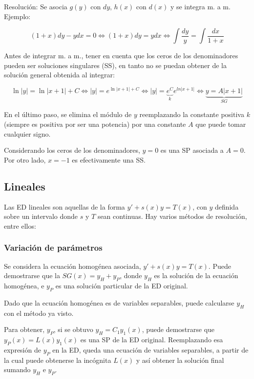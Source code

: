 \documentclass{article}
\begin{document}
Resolución: Se asocia $g(y)$ con $dy$, $h(x)$ con $d(x)$ y se integra m. a m. Ejemplo:

\begin{equation}
(1+x) dy - y dx = 0 \Leftrightarrow (1+x) dy = y dx \Leftrightarrow \int \frac{dy}{y} = \int \frac{dx}{1+x}
\end{equation}

Antes de integrar m. a m., tener en cuenta que los ceros de los denominadores pueden ser soluciones singulares (SS), en tanto no se puedan obtener de la solución general obtenida al integrar:

\begin{equation}
\ln |y| = \ln |x + 1| + C \Leftrightarrow |y| = e^{\ln |x+1| + C } \Leftrightarrow |y| = \underbrace{e^C}_{k} e^{ln |x+1|} \Leftrightarrow \underbrace{y = A |x+1|}_{SG}
\end{equation}

En el último paso, se elimina el módulo de $y$ reemplazando la constante positiva $k$ (siempre es positiva por ser una potencia) por una constante $A$ que puede tomar cualquier signo.

Considerando los ceros de los denominadores, $y = 0$ es una SP asociada a $A = 0$. Por otro lado, $x = -1$ es efectivamente una SS.

\subsection{Lineales}

Las ED lineales son aquellas de la forma $y' + s(x) y = T(x)$, con $y$ definida sobre un intervalo donde $s$ y $T$ sean continuas. Hay varios métodos de resolución, entre ellos:

\subsubsection{Variación de parámetros}

Se considera la ecuación homogénea asociada, $y' + s(x) y = T(x)$. Puede demostrarse que la $SG(x) = y_H + y_P$, donde $y_H$ es la solución de la ecuación homogénea, e $y_P$ es una solución particular de la ED original.

Dado que la ecuación homogénea es de variables separables, puede calcularse $y_H$ con el método ya visto.

Para obtener, $y_P$, si se obtuvo $y_H = C_1 y_1(x)$, puede demostrarse que $y_P(x) = L(x) y_1(x)$ es una SP de la ED original. Reemplazando esa expresión de $y_P$ en la ED, queda una ecuación de variables separables, a partir de la cual puede obtenerse la incógnita $L(x)$ y así obtener la solución final sumando $y_H$ e $y_P$.
\end{document}
